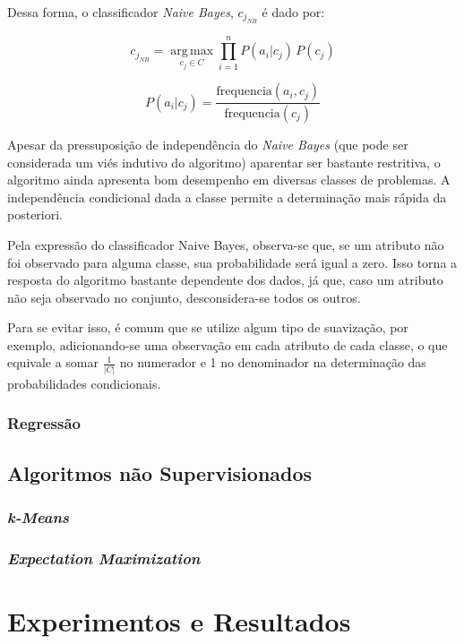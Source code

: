 \documentclass{article}
\begin{document}
Dessa forma, o classificador {\it Naive Bayes}, $c_{j_{NB}}$ é dado por:

\begin{equation}
c_{j_{NB}} = \operatorname*{arg\,max}_{c_j \in C} \prod_{i=1}^n P(a_i|c_j) \, P(c_j)
\end{equation}

\begin{equation}
P(a_i|c_j) = \frac{\mathrm{frequencia}(a_i,c_j)}{\mathrm{frequencia}(c_j)}
\end{equation}

Apesar da pressuposição de independência do {\it Naive Bayes}
(que pode ser considerada um viés indutivo do algoritmo) aparentar ser bastante restritiva,
o algoritmo ainda apresenta bom desempenho em diversas classes de problemas.
A independência condicional dada a classe permite a determinação mais rápida da posteriori.

Pela expressão do classificador Naive Bayes, observa-se que,
se um atributo não foi observado para alguma classe, sua probabilidade será igual a zero.
Isso torna a resposta do algoritmo bastante dependente dos dados,
já que, caso um atributo não seja observado no conjunto, desconsidera-se todos os outros.

Para se evitar isso, é comum que se utilize algum tipo de suavização, por exemplo,
adicionando-se uma observação em cada atributo de cada classe,
o que equivale a somar $\frac{1}{|C|}$ no numerador e 1 no denominador na determinação das probabilidades condicionais.

\subsubsection{Regressão}

\subsection{Algoritmos não Supervisionados}

\subsubsection{{\b \it k-Means}}

\subsubsection{{\b \it Expectation Maximization}}

\section{Experimentos e Resultados}
\end{document}
